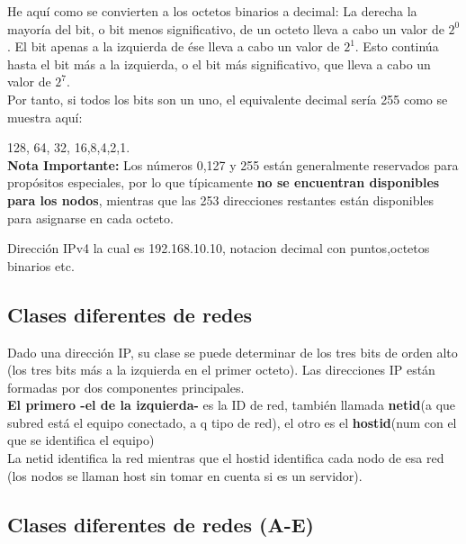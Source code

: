\documentclass[letterpaper,12pt]{article}
\begin{document}
\begin{sloppypar}
He aquí como se convierten a los octetos binarios a decimal: 
La derecha la mayoría del bit, o bit menos significativo, de un octeto lleva a cabo un valor de $2^0$. El bit apenas a la izquierda de ése lleva a cabo un valor de $2^1$. Esto continúa hasta el bit más a la izquierda, o el bit más significativo, que lleva a cabo un valor de $2^7$.
\vspace{0.3cm}\\
Por tanto, si todos los bits son un uno, el equivalente decimal sería 255 como se muestra aquí:

128, 64, 32, 16,8,4,2,1.
\vspace{0.3cm}\\
\textbf{Nota Importante:} Los números 0,127 y 255 están generalmente reservados para propósitos especiales, por lo que típicamente \textbf{no se encuentran disponibles para los nodos}, mientras que las 253 direcciones restantes están disponibles para asignarse en cada octeto.

Dirección IPv4 la cual es 192.168.10.10, notacion decimal con puntos,octetos binarios etc.

\subsection{Clases diferentes de redes}
Dado una dirección IP, su clase se puede determinar de los tres bits de orden alto (los tres bits más a la izquierda en el primer octeto). Las direcciones IP están formadas por dos componentes principales. 
\vspace{0.3cm}\\ 
\textbf{El primero -el de la izquierda-} es la ID de red, también llamada \textbf{netid}(a que subred está el equipo conectado, a q tipo de red), el otro es el \textbf{hostid}(num con el que se identifica el equipo)
\vspace{0.3cm}\\ 
La netid identifica la red mientras que el hostid identifica cada nodo de esa red (los nodos se llaman host sin tomar en cuenta si es un servidor). 

\subsection{Clases diferentes de redes (A-E)}

\end{sloppypar}
\end{document}
